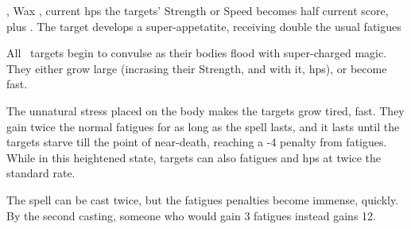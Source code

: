   {\mEarth,\mWater}%
  {Wax}%
  {\detailed,\duplicated}%
  {current \glspl{hp}}%
  {the targets' Strength or Speed becomes half current score, plus . The target develops a super-appetatite, receiving double the usual \glspl{fatigue}}%
  {
    All \spellArea\ targets begin to convulse as their bodies flood with super-charged magic.
    They either grow large (incrasing their Strength, and with it, \glspl{hp}), or become fast.

    The unnatural stress placed on the body makes the targets grow tired, fast.
    They gain twice the normal \glspl{fatigue} for as long as the spell lasts, and it lasts until the targets starve till the point of near-death, reaching a -4 penalty from \glspl{fatigue}.
    While in this heightened state, targets can also \glspl{fatigue} and \glspl{hp} at twice the standard rate.

    The spell can be cast twice, but the \glspl{fatigue} penalties become immense, quickly.
    By the second casting, someone who would gain 3 \glspl{fatigue} instead gains 12.
  }

